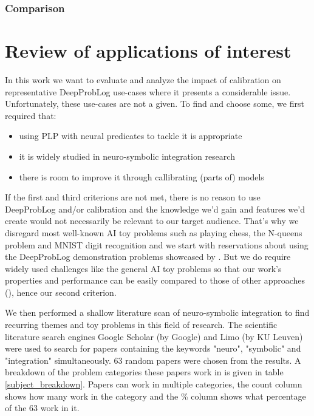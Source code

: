 \subsubsection{Comparison}

\section{Review of applications of interest}
In this work we want to evaluate and analyze the impact of calibration on representative DeepProbLog use-cases where it presents a considerable issue. Unfortunately, these use-cases are not a given. To find and choose some, we first required that:
\begin{itemize}
  \item using PLP with neural predicates to tackle it is appropriate
  \item it is widely studied in neuro-symbolic integration research
  \item there is room to improve it through callibrating (parts of) models
\end{itemize}
If the first and third criterions are not met, there is no reason to use DeepProbLog and/or calibration and the knowledge we'd gain and features we'd create would not necessarily be relevant to our target audience. That's why we disregard most well-known AI toy problems such as playing chess, the N-queens problem and MNIST digit recognition and we start with reservations about using the DeepProbLog demonstration problems showcased by \cite{manhaeve2018deepproblog}. But we do require widely used challenges like the general AI toy problems so that our work's properties and performance can be easily compared to those of other approaches (\cite{russell2002artificial}), hence our second criterion. \par
We then performed a shallow literature scan of neuro-symbolic integration to find recurring themes and toy problems in this field of research. The scientific literature search engines Google Scholar (by Google) and Limo (by KU Leuven) were used to search for papers containing the keywords "neuro", "symbolic" and "integration" simultaneously. 63 random papers were chosen from the results. A breakdown of the problem categories these papers work in is given in table \ref{subject_breakdown}. Papers can work in multiple categories, the count column shows how many work in the category and the \% column shows what percentage of the 63 work in it.
